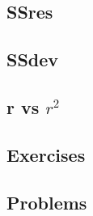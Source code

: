 \subsection{SSres}
\subsection{SSdev}
\subsection{r vs $r^2$}
\newpage
\subsection{Exercises}

\newpage
{}
\subsection{Problems}
\noindent{}
\newpage
